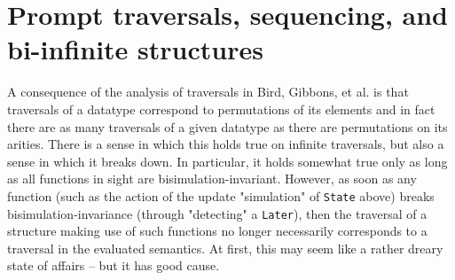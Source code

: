 \documentclass[sigplan,screen]{acmart}
\newenvironment{code}
 {\VerbatimEnvironment
  \begin{verbatim}}
 {\end{verbatim}}
\newcommand{\hs}{\texttt}
\begin{document}
   
\begin{comment}
\begin{code}
  
foo :: [(Update (PStream Int) Int Int)  ]
foo = [getState, putIt 1 >> getState, putIt 3 >> getState, getState >>= \x -> putIt (x + 1) >> getState, getState, getState >>= \x -> putIt (x + 1) >> getState, getState >>= \x -> putIt (x + 1)  >> getState >>= \x -> putIt (x + 1)  >> getState >>= \x -> putIt (x + 1)  >> getState]
   where putIt i = putAction $ PCons i PNil
  
bar :: [State Int Int]
bar = [get, put 1 >> get, put 3 >> get, get >>= \x -> put (x + 1) >> get, get, get >>= \x -> put (x + 1) >> get, get >>= \x -> put (x + 1) >> get >>= \x -> put (x + 2) >> get]

listToStream (x:xs) = Cons x . Later $ listToStream xs
listToStream [] = Nil

streamToList Nil = []
streamToList (Cons a (Later b)) = a : streamToList b

deriving instance Show a => Show (PStream a)

deriving instance Show a => Show (Stream a)

deriving instance Show a => Show (Later a)

instance (ApplyAction p s) => Applicative (Update p s) where
  pure a = Update $ \_ -> (mempty, a)
  x <*> y = x `ap` y
\end{code}
\end{comment}

\section{Prompt traversals, sequencing, and bi-infinite structures}

A consequence of the analysis of traversals in Bird, Gibbons, et al. \cite{bird2013understanding} is that traversals of a datatype correspond to permutations of its elements and in fact there are as many traversals of a given datatype as there are permutations on its arities. There is a sense in which this holds true on infinite traversals, but also a sense in which it breaks down. In particular, it holds somewhat true only as long as all functions in sight are bisimulation-invariant. However, as soon as any function (such as the action of the update "simulation" of \hs{State} above) breaks bisimulation-invariance (through "detecting" a \hs{Later}), then the traversal of a structure making use of such functions no longer necessarily corresponds to a traversal in the evaluated semantics. At first, this may seem like a rather dreary state of affairs -- but it has good cause.
\end{document}
